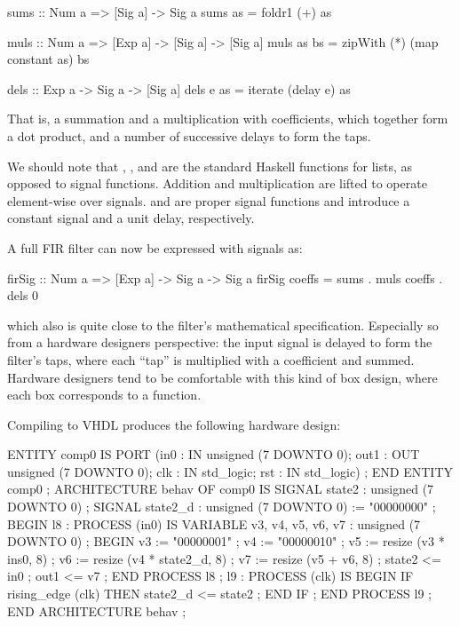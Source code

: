 \documentclass[../paper.tex]{subfiles}
\begin{document}
\begin{code}
sums :: Num a => [Sig a] -> Sig a
sums as = foldr1 (+) as

muls :: Num a => [Exp a] -> [Sig a] -> [Sig a]
muls as bs = zipWith (*) (map constant as) bs

dels :: Exp a -> Sig a -> [Sig a]
dels e as = iterate (delay e) as
\end{code}

\noindent That is, a summation and a multiplication with coefficients, which together form a dot product, and a number of successive delays to form the taps.

We should note that , ,  and  are the standard Haskell functions for lists, as opposed to signal functions. Addition and multiplication are lifted to operate element-wise over signals.  and  are proper signal functions and introduce a constant signal and a unit delay, respectively.

A full FIR filter can now be expressed with signals as:

\begin{code}
firSig :: Num a => [Exp a] -> Sig a -> Sig a
firSig coeffs = sums . muls coeffs . dels 0
\end{code}

\noindent which also is quite close to the filter's mathematical specification. Especially so from a hardware designers perspective: the input signal is delayed to form the filter's taps, where each ``tap'' is multiplied with a coefficient and summed. Hardware designers tend to be comfortable with this kind of box design, where each box corresponds to a function.

Compiling  to VHDL produces the following hardware design:

\begin{code}
ENTITY comp0 IS
  PORT (in0 : IN unsigned (7 DOWNTO 0);
        out1 : OUT unsigned (7 DOWNTO 0);
        clk : IN std_logic;
        rst : IN std_logic) ;
END ENTITY comp0 ;
ARCHITECTURE behav OF comp0 IS
  SIGNAL state2 : unsigned (7 DOWNTO 0) ;
  SIGNAL state2_d : unsigned (7 DOWNTO 0) := "00000000" ;
BEGIN
  l8 :
    PROCESS (in0) IS
      VARIABLE v3, v4, v5, v6, v7 : unsigned (7 DOWNTO 0) ; 
    BEGIN
      v3 := "00000001" ;
      v4 := "00000010" ;
      v5 := resize (v3 * ins0, 8) ;
      v6 := resize (v4 * state2_d, 8) ;
      v7 := resize (v5 + v6, 8) ;
      state2 <= in0 ;
      out1 <= v7 ;
    END PROCESS l8 ;
  l9 :
    PROCESS (clk) IS
    BEGIN
      IF rising_edge (clk) THEN
        state2_d <= state2 ;
      END IF ;
    END PROCESS l9 ;
END ARCHITECTURE behav ;
\end{code}
\end{document}
